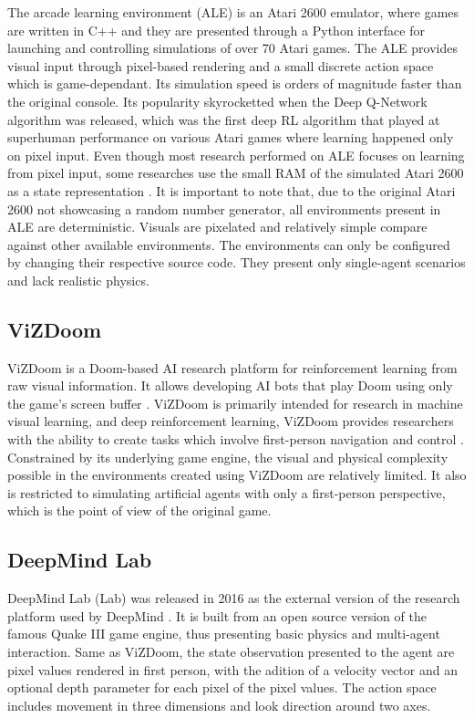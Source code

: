 The arcade learning environment (ALE) \citep{Bellemare2015} is an Atari 2600 emulator, where games are written in C++ and they are presented through a Python interface for launching and controlling simulations of over 70 Atari games. The ALE provides visual input through pixel-based rendering and a small discrete action space which is game-dependant. Its simulation speed is orders of magnitude faster than the original console. Its popularity skyrocketted when the Deep Q-Network algorithm \citep{Mnih2013} was released, which was the first deep RL algorithm that played at superhuman performance on various Atari games where learning happened only on pixel input. Even though most research performed on ALE focuses on learning from pixel input, some researches use the small RAM of the simulated Atari 2600 as a state representation \citep{Sygnowski2016}. It is important to note that, due to the original Atari 2600 not showcasing a random number generator, all environments present in ALE are deterministic. Visuals are pixelated and relatively simple compare against other available environments. The environments can only be configured by changing their respective source code. They present only single-agent scenarios and lack realistic physics.

\subsection{ViZDoom}
ViZDoom is a Doom-based AI research platform for reinforcement learning from raw visual information. It allows developing AI bots that play Doom using only the game's screen buffer \citep{Kempka2017}. ViZDoom is primarily intended for research in machine visual learning, and deep reinforcement learning, ViZDoom provides researchers with the ability to create tasks which involve first-person navigation and control \citep{Ha2018}. Constrained by its underlying game engine, the visual and physical complexity possible in the environments created using ViZDoom are relatively limited. It also is restricted to simulating artificial agents with only a first-person perspective, which is the point of view of the original game.

\subsection{DeepMind Lab}
DeepMind Lab (Lab) was released in 2016 as the external version of the research platform used by DeepMind \citep{Beattie2016}. It is built from an open source version of the famous Quake III game engine, thus presenting basic physics and multi-agent interaction. Same as ViZDoom, the state observation presented to the agent are pixel values rendered in first person, with the adition of a velocity vector and an optional depth parameter for each pixel of the pixel values. The action space includes movement in three dimensions and look direction around two axes.

